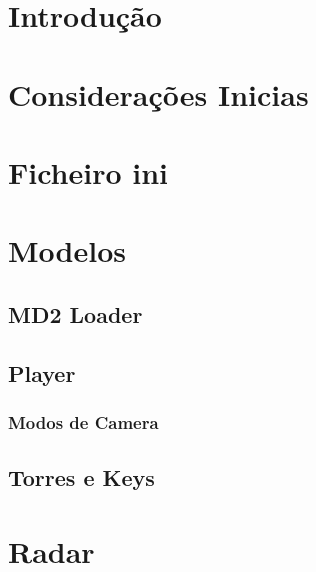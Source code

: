 \documentclass[12pt,a4paper,portuges]{style/myreport}
\begin{document}
\newpage




\chapter{Introdução}


\newpage

\chapter{Considerações Inicias}


\newpage

\chapter{Ficheiro ini}


\newpage

\chapter{Modelos}


\newpage

\section{MD2 Loader}


\newpage

\section{Player}

\subsection{Modos de Camera}


\newpage

\section{Torres e Keys}


\newpage

\chapter{Radar}

\end{document}
